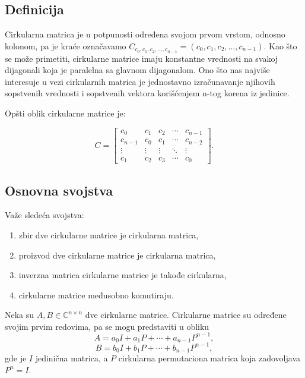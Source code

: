 \documentclass[12pt,a4paper]{report}
\begin{document}
\subsection{Definicija}

Cirkularna matrica je u potpunosti određena svojom prvom vrstom, odnosno
kolonom, pa je kraće označavamo $C_{c_0, c_1, c_2, \dots, c_{n-1}} = (c_0, c_1, c_2, \dots, c_{n-1})$. Kao
što se može primetiti, cirkularne matrice imaju konstantne vrednosti na svakoj
dijagonali koja je paralelna sa glavnom dijagonalom. Ono što nas najviše interesuje
u vezi cirkularnih matrica je jednostavno izračunavanje njihovih sopstvenih
vrednosti i sopstvenih vektora korišćenjem n-tog korena iz jedinice.

Opšti oblik cirkularne matrice je:

\[
C=
\begin{bmatrix}
	c_0 & c_1 & c_2 & \cdots & c_{n-1}\\
	c_{n-1} & c_0 & c_1 & \cdots & c_{n-2}\\
	\vdots & \vdots & \vdots & \ddots & \vdots\\
	c_1 & c_2 & c_3 & \cdots & c_0
\end{bmatrix}.
\]

\subsection{Osnovna svojstva}

Važe sledeća svojstva:

\begin{enumerate}
	\item zbir dve cirkularne matrice je cirkularna matrica,
	\item proizvod dve cirkularne matrice je cirkularna matrica,
	\item inverzna matrica cirkularne matrice je takođe cirkularna,
	\item cirkularne matrice međusobno komutiraju.
\end{enumerate}


Neka su $A,B\in\mathbb{C}^{n\times n}$ dve cirkularne matrice.
Cirkularne matrice su određene svojim prvim redovima, pa se mogu
predstaviti u obliku
\[
A=a_0I+a_1P+\cdots+a_{n-1}P^{n-1},
\]
\[
B=b_0I+b_1P+\cdots+b_{n-1}P^{n-1},
\]
gde je $I$ jedinična matrica, a $P$ cirkularna permutaciona matrica
koja zadovoljava $P^n=I$.
\end{document}
